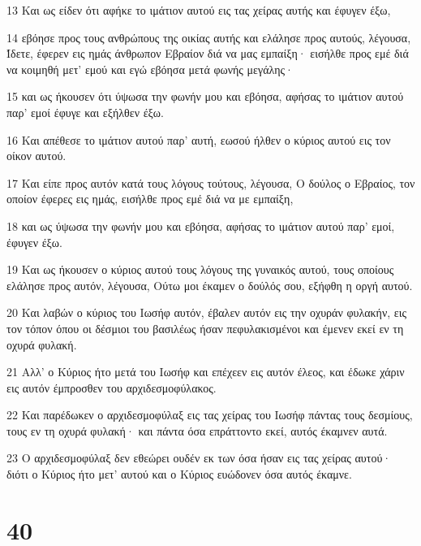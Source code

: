\par 13 Και ως είδεν ότι αφήκε το ιμάτιον αυτού εις τας χείρας αυτής και έφυγεν έξω,
\par 14 εβόησε προς τους ανθρώπους της οικίας αυτής και ελάλησε προς αυτούς, λέγουσα, Ίδετε, έφερεν εις ημάς άνθρωπον Εβραίον διά να μας εμπαίξη· εισήλθε προς εμέ διά να κοιμηθή μετ' εμού και εγώ εβόησα μετά φωνής μεγάλης·
\par 15 και ως ήκουσεν ότι ύψωσα την φωνήν μου και εβόησα, αφήσας το ιμάτιον αυτού παρ' εμοί έφυγε και εξήλθεν έξω.
\par 16 Και απέθεσε το ιμάτιον αυτού παρ' αυτή, εωσού ήλθεν ο κύριος αυτού εις τον οίκον αυτού.
\par 17 Και είπε προς αυτόν κατά τους λόγους τούτους, λέγουσα, Ο δούλος ο Εβραίος, τον οποίον έφερες εις ημάς, εισήλθε προς εμέ διά να με εμπαίξη,
\par 18 και ως ύψωσα την φωνήν μου και εβόησα, αφήσας το ιμάτιον αυτού παρ' εμοί, έφυγεν έξω.
\par 19 Και ως ήκουσεν ο κύριος αυτού τους λόγους της γυναικός αυτού, τους οποίους ελάλησε προς αυτόν, λέγουσα, Ούτω μοι έκαμεν ο δούλός σου, εξήφθη η οργή αυτού.
\par 20 Και λαβών ο κύριος του Ιωσήφ αυτόν, έβαλεν αυτόν εις την οχυράν φυλακήν, εις τον τόπον όπου οι δέσμιοι του βασιλέως ήσαν πεφυλακισμένοι και έμενεν εκεί εν τη οχυρά φυλακή.
\par 21 Αλλ' ο Κύριος ήτο μετά του Ιωσήφ και επέχεεν εις αυτόν έλεος, και έδωκε χάριν εις αυτόν έμπροσθεν του αρχιδεσμοφύλακος.
\par 22 Και παρέδωκεν ο αρχιδεσμοφύλαξ εις τας χείρας του Ιωσήφ πάντας τους δεσμίους, τους εν τη οχυρά φυλακή· και πάντα όσα επράττοντο εκεί, αυτός έκαμνεν αυτά.
\par 23 Ο αρχιδεσμοφύλαξ δεν εθεώρει ουδέν εκ των όσα ήσαν εις τας χείρας αυτού· διότι ο Κύριος ήτο μετ' αυτού και ο Κύριος ευώδονεν όσα αυτός έκαμνε.

\chapter{40}

